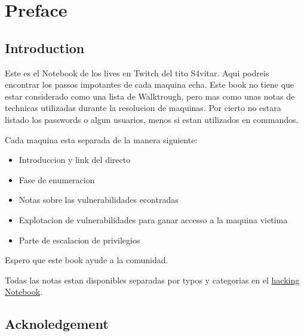 \documentclass{assets/ipesethesis}
\providecommand{\tightlist}{%
  \setlength{\itemsep}{0pt}\setlength{\parskip}{0pt}}
\begin{document}


  \hypersetup{linkcolor=black}
  \setcounter{tocdepth}{1}
  \tableofcontents


\mainmatter %
\pagestyle{fancyplain} %

\hypertarget{preface-1}{%
\chapter*{Preface}\label{preface-1}}

\hypertarget{introduction-1}{%
\section*{Introduction}\label{introduction-1}}

Este es el Notebook de los lives en Twitch del tito S4vitar. Aqui podreis encontrar los passos impotantes de cada maquina
echa. Este book no tiene que estar considerado como una lista de Walktrough, pero mas como unas notas de technicas utilizadas
durante la resolucion de maquinas. Por cierto no estara listado los passwords o algun usuarios, menos si estan utilizados en
commandos.

Cada maquina esta separada de la manera siguiente:

\begin{itemize}
\tightlist
\item
  Introduccion y link del directo
\item
  Fase de enumeracion
\item
  Notas sobre las vulnerabilidades econtradas
\item
  Explotacion de vulnerabilidades para ganar accesso a la maquina victima
\item
  Parte de escalacion de privilegios
\end{itemize}

Espero que este book ayude a la comunidad.

Todas las notas estan disponibles separadas por typos y categorias en el \href{https://looping404.michellopez.org}{hacking Notebook}.

\hypertarget{acknoledgement-1}{%
\section*{Acknoledgement}\label{acknoledgement-1}}
\end{document}
